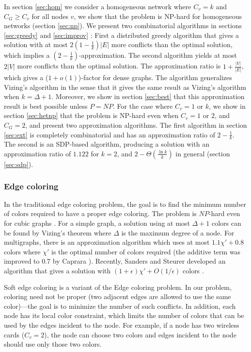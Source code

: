 \documentclass[titlepage, 11pt]{article}
\newcommand{\B}{\vspace*{-\smallskipamount}}
\begin{document}
In section \ref{sec:hom} we consider a homogeneous network where $C_v = k$
and $C_G \ge C_v$ for all nodes $v$,  we show 
that the problem is NP-hard for homogeneous networks (section \ref{sec:np}).
We present two combinatorial algorithms in sections \ref{sec:greedy} and \ref{sec:improv} :
First a distributed greedy algorithm that
gives a solution with at most $2(1-\frac{1}{k})|E|$ more conflicts than the optimal solution,
which implies a $(2 - \frac{1}{k})$-approximation. 
The second algorithm  yields at most $2|V|$ more conflicts than the optimal solution. 
The approximation ratio is $1 + \frac{|V|}{|E|}$, which gives a ($1 + o(1)$)-factor for dense graphs. 
The algorithm generalizes Vizing's algorithm in the sense that it gives the same result as Vizing's algorithm when $k = \Delta + 1$. Moreover, we show in section \ref{sec:best} that this approximation result is best possible unless $P = NP$.
\B
For the case where $C_v = 1$ or $k$,
we show in section \ref{sec:hetnp} that the problem is NP-hard even when $C_v = 1$ or $2$, and $C_G = 2$, and present two approximation algorithms.
The first algorithm in section \ref{sec:ext} is completely combinatorial and has an approximation ratio of $2-\frac{1}{k}$. The second is an SDP-based algorithm, producing a solution with an approximation ratio of $1.122$ for $k = 2$, and $2-\Theta(\frac{\ln k}{k})$ in general (section \ref{sec:sdp}).

\subsubsection{Edge coloring}
In the traditional edge coloring problem,
the goal is to find the minimum number 
of colors required to have a proper edge coloring.
The problem is $NP$-hard even for cubic graphs \cite{Holyer}.
For a simple graph, a solution using at most $\Delta + 1$ colors
can be found by Vizing's theorem \cite{V64} where
$\Delta$ is the maximum degree of a node.
For multigraphs, there is an approximation algorithm
which uses at most $1.1 \chi' + 0.8$ colors where $\chi'$ is the optimal number of colors 
required \cite{multigraph} (the additive term was improved to $0.7$ by Caprara
 \cite{caprara98improving}). 
Recently, Sanders and Steurer developed an algorithm that
gives a solution with $(1+\epsilon) \chi'+O(1/\epsilon)$ colors \cite{sanders05}.


{\sc Soft edge coloring} is a variant of the {\sc Edge coloring} problem.
In our problem, coloring need not be proper (two adjacent edges
are allowed to use the same color)---the goal is to minimize the
number of such conflicts. In addition, each node has its local color constraint, which limits the
number of colors that can be used by the edges incident to the node.
For example, if a node has two wireless cards ($C_v = 2$), 
the node can choose two colors 
and edges incident to the node should use only those two colors.
\end{document}
